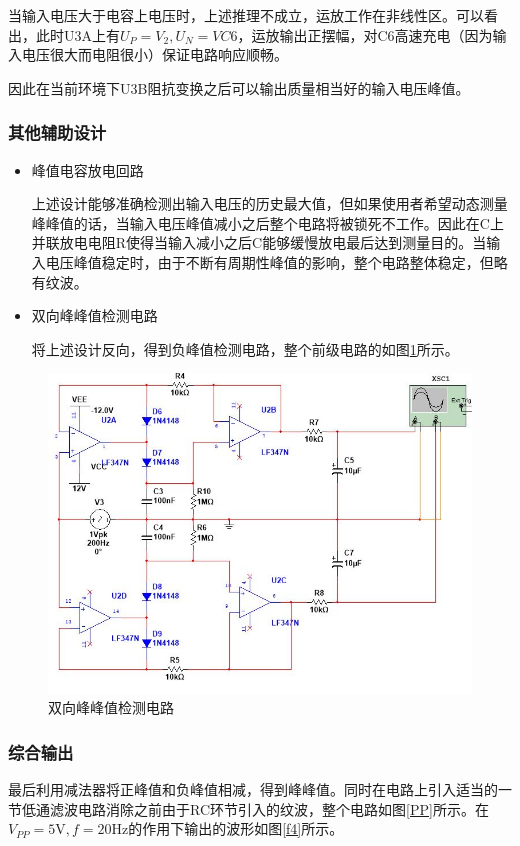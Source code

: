 \documentclass[UTF8,a4paper,landscape,16pt]{paper}
\begin{document}
\begin{multicols}{4}
\noindent 当输入电压大于电容上电压时，上述推理不成立，运放工作在非线性区。可以看出，此时U3A上有$U_P=V_2,U_N=V{C6}$，运放输出正摆幅，对C6高速充电（因为输入电压很大而电阻很小）保证电路响应顺畅。

\noindent 因此在当前环境下U3B阻抗变换之后可以输出质量相当好的输入电压峰值。

\subsubsection{其他辅助设计}
\begin{itemize}
\item 峰值电容放电回路

\noindent 上述设计能够准确检测出输入电压的历史最大值，但如果使用者希望动态测量峰峰值的话，当输入电压峰值减小之后整个电路将被锁死不工作。因此在C上并联放电电阻R使得当输入减小之后C能够缓慢放电最后达到测量目的。当输入电压峰值稳定时，由于不断有周期性峰值的影响，整个电路整体稳定，但略有纹波。

\item 双向峰峰值检测电路

\noindent 将上述设计反向，得到负峰值检测电路，整个前级电路的如图\ref{f3}所示。

\end{itemize}

\begin{figure}[H]
\centering
\includegraphics[width=\columnwidth]{f3.jpg}
\caption{双向峰峰值检测电路}
\label{f3}
\end{figure}

\subsubsection{综合输出}
\noindent 最后利用减法器将正峰值和负峰值相减，得到峰峰值。同时在电路上引入适当的一节低通滤波电路消除之前由于RC环节引入的纹波，整个电路如图\ref{PP}所示。在$V_{PP}=5\mathrm{V},f=20\mathrm{Hz}$的作用下输出的波形如图\ref{f4}所示。


\end{multicols}
\end{document}
